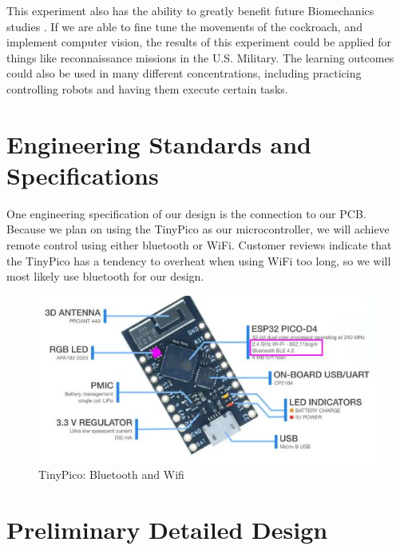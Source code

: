 \documentclass{article}
\begin{document}
\par This experiment also has the ability to greatly benefit future  Biomechanics studies . If we are able to fine tune the movements of the cockroach, and implement computer vision, the results of this experiment could be applied for things like reconnaissance missions in the U.S. Military. The learning outcomes could also be used in many different concentrations, including practicing controlling robots and having them execute certain tasks. 

\section{Engineering Standards and Specifications}
\par One engineering specification of our design is the connection to our PCB. Because we plan on using the TinyPico as our microcontroller, we will achieve remote control using either bluetooth or WiFi. Customer reviews indicate that the TinyPico has a tendency to overheat when using WiFi too long, so we will most likely use bluetooth for our design.

\begin{figure}[ht!]
\centering
\includegraphics[scale=0.5]{ss.JPG}
\caption{TinyPico: Bluetooth and Wifi}
\label{fig:ss}
\end{figure}

\section{Preliminary Detailed Design}
\end{document}

